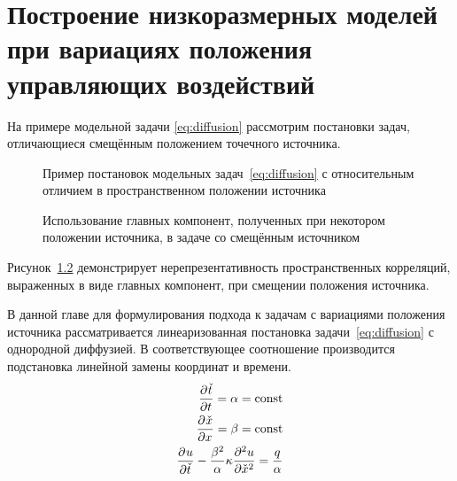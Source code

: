\chapter{Построение низкоразмерных моделей при вариациях положения управляющих воздействий}\label{ch:ch3}

На примере модельной задачи \ref{eq:diffusion} рассмотрим постановки задач, отличающиеся смещённым положением точечного источника.

\begin{figure}[ht]
    \caption{Пример постановок модельных задач~\ref{eq:diffusion} с относительным отличием в пространственном положении источника~\cite{Elizarev2022}}\label{fig:q-deviation}
\end{figure}

\begin{figure}[ht]
    \caption{Использование главных компонент, полученных при некотором положении источника, в задаче со смещённым источником~\cite{Elizarev2022}}\label{fig:q-diff}
\end{figure}
Рисунок~\ref{fig:q-diff} демонстрирует нерепрезентативность пространственных корреляций, выраженных в виде главных компонент, при смещении положения источника.

В данной главе для формулирования подхода к задачам с вариациями положения источника рассматривается линеаризованная постановка задачи~\ref{eq:diffusion} с однородной диффузией. В соответствующее соотношение производится подстановка линейной замены координат и времени.
\begin{align}
    \deriv{\check{t}}{t} = \alpha = \text{const} \\
    \deriv{\check{x}}{x} = \beta = \text{const} \\
    \deriv{u}{\check{t}} - \frac{\beta^2}{\alpha} \kappa \deriv[2]{u}{\check{x}} = \frac{q}{\alpha}
\end{align}


